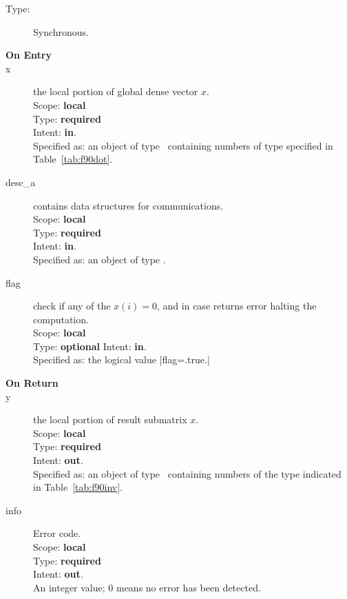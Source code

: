 \begin{description}
	\item[Type:] Synchronous.
	\item[\bf On Entry]
	\item[x] the local portion of global dense vector
	$x$.\\
	Scope: {\bf local} \\
	Type: {\bf required} \\
	Intent: {\bf in}.\\
	Specified as:  an object of type \vdata\
	containing numbers of type specified in
	Table~\ref{tab:f90dot}.
	\item[desc\_a] contains data structures for communications.\\
	Scope: {\bf local} \\
	Type: {\bf required}\\
	Intent: {\bf in}.\\
	Specified as: an object of type \descdata.
	\item[flag] check if any of the $x(i) = 0$, and in case returns error halting the computation.\\
	Scope: {\bf local} \\
	Type: {\bf optional}
	Intent: {\bf in}.\\
	Specified as: the logical value \fortinline|flag=.true.|
	\item[\bf On Return]
	\item[y] the local portion of result submatrix $x$.\\
	Scope: {\bf local} \\
	Type: {\bf required} \\
	Intent: {\bf out}.\\
	Specified as: an object of type \vdata\ containing numbers of the type
	indicated in Table~\ref{tab:f90inv}.
	\item[info] Error code.\\
	Scope: {\bf local} \\
	Type: {\bf required} \\
	Intent: {\bf out}.\\
	An integer value; 0 means no error has been detected.
\end{description}

